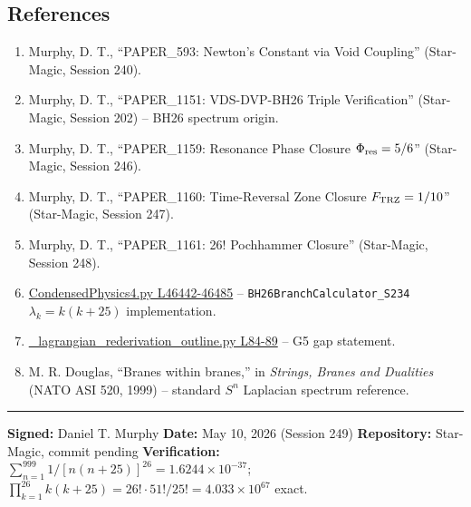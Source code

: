 \documentclass[
]{article}
\providecommand{\tightlist}{%
  \setlength{\itemsep}{0pt}\setlength{\parskip}{0pt}}
\begin{document}
\subsection{References}\label{references}

\begin{enumerate}
\def\labelenumi{\arabic{enumi}.}
\tightlist
\item
  Murphy, D. T., ``PAPER\_593: Newton's Constant via Void Coupling''
  (Star-Magic, Session 240).
\item
  Murphy, D. T., ``PAPER\_1151: VDS-DVP-BH26 Triple Verification''
  (Star-Magic, Session 202) -- BH26 spectrum origin.
\item
  Murphy, D. T., ``PAPER\_1159: Resonance Phase Closure
  \(\Phi_{\rm res}=5/6\)'' (Star-Magic, Session 246).
\item
  Murphy, D. T., ``PAPER\_1160: Time-Reversal Zone Closure
  \(F_{\rm TRZ}=1/10\)'' (Star-Magic, Session 247).
\item
  Murphy, D. T., ``PAPER\_1161: 26! Pochhammer Closure'' (Star-Magic,
  Session 248).
\item
  \href{CondensedPhysics4.py\#L46442}{CondensedPhysics4.py L46442-46485}
  -- \texttt{BH26BranchCalculator\_S234} \(\lambda_k = k(k+25)\)
  implementation.
\item
  \href{_lagrangian_rederivation_outline.py\#L84}{\_lagrangian\_rederivation\_outline.py
  L84-89} -- G5 gap statement.
\item
  M. R. Douglas, ``Branes within branes,'' in \emph{Strings, Branes and
  Dualities} (NATO ASI 520, 1999) -- standard \(S^{n}\) Laplacian
  spectrum reference.
\end{enumerate}

\begin{center}\rule{0.5\linewidth}{0.5pt}\end{center}

\textbf{Signed:} Daniel T. Murphy \textbf{Date:} May 10, 2026 (Session
249) \textbf{Repository:} Star-Magic, commit pending
\textbf{Verification:}
\(\sum_{n=1}^{999}1/[n(n+25)]^{26} = 1.6244\times10^{-37}\);
\(\prod_{k=1}^{26}k(k+25) = 26!\cdot 51!/25! = 4.033\times10^{67}\)
exact.




\end{document}

